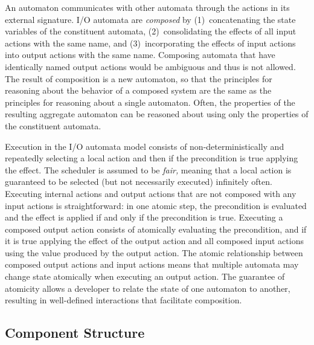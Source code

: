 An automaton communicates with other automata through the actions in its external signature.
I/O automata are \emph{composed} by (1)~concatenating the state variables of the constituent automata, (2)~consolidating the effects of all input actions with the same name, and (3)~incorporating the effects of input actions into output actions with the same name.
Composing automata that have identically named output actions would be ambiguous and thus is not allowed.
The result of composition is a new automaton, so that the principles for reasoning about the behavior of a composed system are the same as the principles for reasoning about a single automaton.
Often, the properties of the resulting aggregate automaton can be reasoned about using only the properties of the constituent automata.

Execution in the I/O automata model consists of non-deterministically and repeatedly selecting a local action and then if the precondition is true applying the effect.
The scheduler is assumed to be \emph{fair,} meaning that a local action is guaranteed to be selected (but not necessarily executed) infinitely often.
Executing internal actions and output actions that are not composed with any input actions is straightforward: in one atomic step, the precondition is evaluated and the effect is applied if and only if the precondition is true.
Executing a composed output action consists of atomically evaluating the precondition, and if it is true applying the effect of the output action and all composed input actions using the value produced by the output action.
The atomic relationship between composed output actions and input actions means that multiple automata may change state atomically when executing an output action.
The guarantee of atomicity allows a developer to relate the state of one automaton to another, resulting in well-defined interactions that facilitate composition.

\subsection{Component Structure\label{component_structure}}

